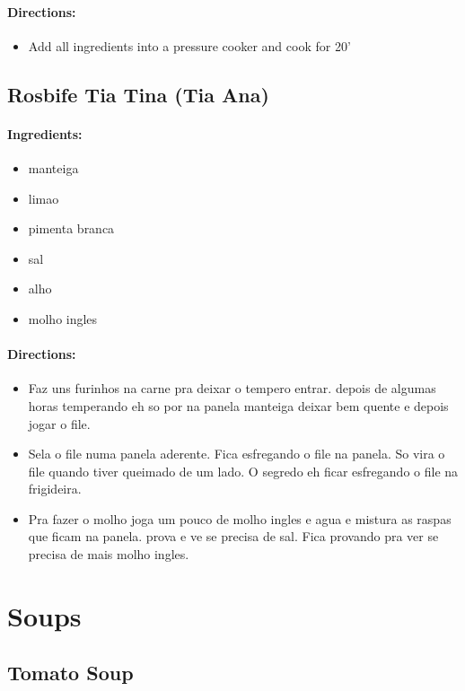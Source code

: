 \documentclass{article}
\begin{document}
\paragraph{Directions:}
\begin{itemize}
    \item Add all ingredients into a pressure cooker and cook for 20'
\end{itemize}

\subsection{Rosbife Tia Tina (Tia Ana)}

\paragraph{Ingredients:}
\begin{itemize}
    \item manteiga
    \item limao
    \item pimenta branca
    \item sal
    \item alho
    \item molho ingles
\end{itemize}

\paragraph{Directions:}
\begin{itemize}
    \item Faz uns furinhos na carne pra deixar o tempero entrar. depois de algumas horas temperando eh so por na panela manteiga deixar bem quente e depois jogar o file.
    \item Sela o file numa panela aderente. Fica esfregando o file na panela. So vira o file quando tiver queimado de um lado. O segredo eh ficar esfregando o file na frigideira.
    \item Pra fazer o molho joga um pouco de molho ingles e agua e mistura as raspas que ficam na panela. prova e ve se precisa de sal. Fica provando pra ver se precisa de mais molho ingles.
\end{itemize}

\section{Soups}


\subsection{Tomato Soup}
\end{document}
